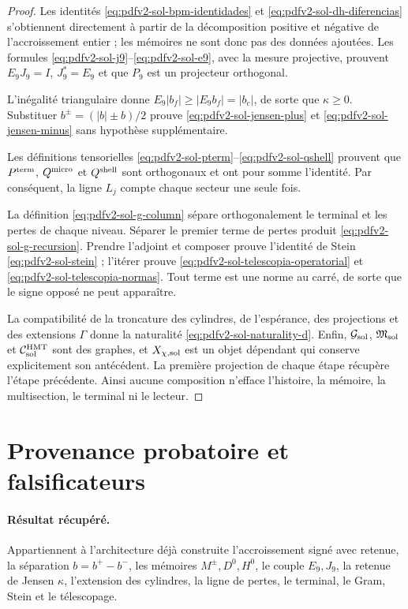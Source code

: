 \begin{proof}
Les identités \eqref{eq:pdfv2-sol-bpm-identidades} et
\eqref{eq:pdfv2-sol-dh-diferencias} s'obtiennent directement à partir de la
décomposition positive et négative de l'accroissement entier ; les
mémoires ne sont donc pas des données ajoutées. Les formules
\eqref{eq:pdfv2-sol-j9}--\eqref{eq:pdfv2-sol-e9}, avec la mesure
projective, prouvent \(E_9J_9=I\), \(J_9^*=E_9\) et que \(P_9\) est un
projecteur orthogonal.

L'inégalité triangulaire donne
\(E_9|b_f|\geq|E_9b_f|=|b_c|\), de sorte que
\(\kappa\geq0\). Substituer
\(b^\pm=(|b|\pm b)/2\) prouve
\eqref{eq:pdfv2-sol-jensen-plus} et
\eqref{eq:pdfv2-sol-jensen-minus} sans hypothèse supplémentaire.

Les définitions tensorielles
\eqref{eq:pdfv2-sol-pterm}--\eqref{eq:pdfv2-sol-qshell} prouvent que
\(P^{\rm term}\), \(Q^{\rm micro}\) et \(Q^{\rm shell}\) sont orthogonaux et
ont pour somme l'identité. Par conséquent, la ligne \(L_j\) compte chaque secteur une
seule fois.

La définition \eqref{eq:pdfv2-sol-g-column} sépare orthogonalement le terminal
et les pertes de chaque niveau. Séparer le premier terme de pertes produit
\eqref{eq:pdfv2-sol-g-recursion}. Prendre l'adjoint et composer prouve l'identité
de Stein \eqref{eq:pdfv2-sol-stein} ; l'itérer prouve
\eqref{eq:pdfv2-sol-telescopia-operatorial} et
\eqref{eq:pdfv2-sol-telescopia-normas}. Tout terme est une norme au carré,
de sorte que le signe opposé ne peut apparaître.

La compatibilité de la troncature des cylindres, de l'espérance, des projections et des
extensions \(\Gamma\) donne la naturalité
\eqref{eq:pdfv2-sol-naturality-d}. Enfin,
\(\mathcal G_{\rm sol}\), \(\mathfrak M_{\rm sol}\) et
\(\mathcal C_{\rm sol}^{\rm HMT}\) sont des graphes, et
\(X_{\chi,{\rm sol}}\) est un objet dépendant qui conserve explicitement
son antécédent. La première projection de chaque étape récupère l'étape
précédente. Ainsi aucune composition n'efface l'histoire, la mémoire, la multisection,
le terminal ni le lecteur.
\end{proof}

\section{Provenance probatoire et falsificateurs}
\label{sec:pdfv2-sol-provenance-falsifiers}

\paragraph{Résultat récupéré.}
Appartiennent à l'architecture déjà construite l'accroissement signé avec retenue,
la séparation \(b=b^+-b^-\), les mémoires \(M^\pm,D^0,H^0\), le couple
\(E_9,J_9\), la retenue de Jensen \(\kappa\), l'extension des cylindres, la
ligne de pertes, le terminal, le Gram, Stein et le télescopage.

